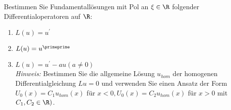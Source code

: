 
\begin{exercise}

Bestimmen Sie Fundamentallösungen mit Pol an $\xi \in \R$ folgender Differentialoperatoren
auf $\R$:
\begin{enumerate}[label = (\roman*)]
  \item $L(u) = u^{\prime}$
  \item $L(u) = u^{\primeprime}$
  \item $L(u) = u^{\prime} - au (a \neq 0)$ \\
  \textit{Hinweis:} Bestimmen Sie die allgemeine Lösung $u_{hom}$ der homogenen
  Differentialgleichung $Lu = 0$ und verwenden Sie einen Ansatz der Form
  $U_0(x) = C_1u_{hom}(x)$ für $x < 0, U_0(x) = C_2u_{hom}(x)$ für $x > 0$ mit
  $C_1,C_2 \in \R)$.
\end{enumerate}

\end{exercise}


